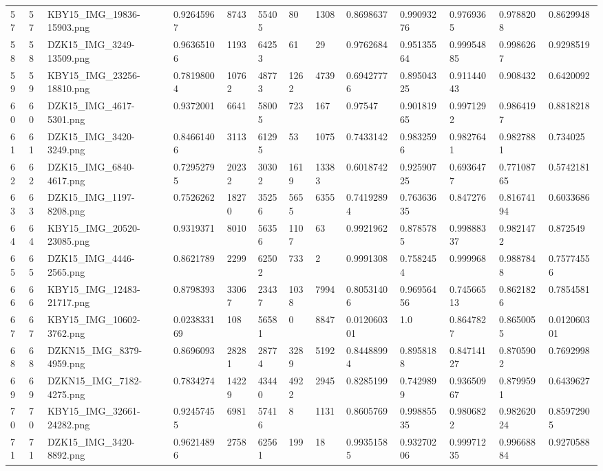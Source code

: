\documentclass[11pt, a4paper, twoside]{report}
\begin{document}
\begin{longtable}[c]{@{}lllllllllllll@{}}
57 & 57 & KBY15\_IMG\_19836-15903.png & 0.92645967 & 8743 & 55405 & 80 & 1308 & 0.8698637 & 0.99093276 & 0.9769365 & 0.9788208 & 0.8629948 \\
58 & 58 & DZK15\_IMG\_3249-13509.png & 0.96365106 & 1193 & 64253 & 61 & 29 & 0.9762684 & 0.95135564 & 0.99954885 & 0.9986267 & 0.9298519 \\
59 & 59 & KBY15\_IMG\_23256-18810.png & 0.78198004 & 10762 & 48773 & 1262 & 4739 & 0.69427776 & 0.89504325 & 0.91144043 & 0.908432 & 0.6420092 \\
60 & 60 & DZK15\_IMG\_4617-5301.png & 0.9372001 & 6641 & 58005 & 723 & 167 & 0.97547 & 0.90181965 & 0.9971292 & 0.9864197 & 0.8818218 \\
61 & 61 & DZK15\_IMG\_3420-3249.png & 0.84661406 & 3113 & 61295 & 53 & 1075 & 0.7433142 & 0.9832596 & 0.9827641 & 0.9827881 & 0.734025 \\
62 & 62 & DZK15\_IMG\_6840-4617.png & 0.72952795 & 20232 & 30302 & 1619 & 13383 & 0.6018742 & 0.92590725 & 0.6936477 & 0.77108765 & 0.5742181 \\
63 & 63 & DZK15\_IMG\_1197-8208.png & 0.7526262 & 18270 & 35256 & 5655 & 6355 & 0.74192894 & 0.76363635 & 0.847276 & 0.81674194 & 0.6033686 \\
64 & 64 & KBY15\_IMG\_20520-23085.png & 0.9319371 & 8010 & 56356 & 1107 & 63 & 0.9921962 & 0.8785785 & 0.99888337 & 0.9821472 & 0.872549 \\
65 & 65 & DZK15\_IMG\_4446-2565.png & 0.8621789 & 2299 & 62502 & 733 & 2 & 0.9991308 & 0.7582454 & 0.999968 & 0.9887848 & 0.75774556 \\
66 & 66 & KBY15\_IMG\_12483-21717.png & 0.8798393 & 33067 & 23437 & 1038 & 7994 & 0.80531406 & 0.96956456 & 0.74566513 & 0.8621826 & 0.7854581 \\
67 & 67 & KBY15\_IMG\_10602-3762.png & 0.023833169 & 108 & 56581 & 0 & 8847 & 0.012060301 & 1.0 & 0.8647827 & 0.8650055 & 0.012060301 \\
68 & 68 & DZKN15\_IMG\_8379-4959.png & 0.8696093 & 28281 & 28774 & 3289 & 5192 & 0.84488994 & 0.8958188 & 0.84714127 & 0.8705902 & 0.7692998 \\
69 & 69 & DZKN15\_IMG\_7182-4275.png & 0.7834274 & 14229 & 43440 & 4922 & 2945 & 0.8285199 & 0.7429899 & 0.93650967 & 0.8799591 & 0.6439627 \\
70 & 70 & KBY15\_IMG\_32661-24282.png & 0.92457455 & 6981 & 57416 & 8 & 1131 & 0.8605769 & 0.99885535 & 0.9806822 & 0.98262024 & 0.85972905 \\
71 & 71 & DZK15\_IMG\_3420-8892.png & 0.96214896 & 2758 & 62561 & 199 & 18 & 0.99351585 & 0.93270206 & 0.99971235 & 0.99668884 & 0.9270588 \\

\end{longtable}
\end{document}
